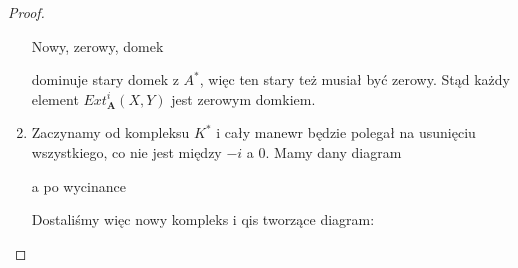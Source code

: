 \begin{proof}
\begin{enumerate}[label=(\alph*)]
      Nowy, zerowy, domek 
      \begin{center}\end{center}
      dominuje stary domek z $A^*$, więc ten stary też musiał być zerowy. Stąd każdy element $Ext^i_{\mathbf{A}}(X, Y)$ jest zerowym domkiem.
    
    \setcounter{enumi}{0}
    \item Zaczynamy od kompleksu $K^*$ i cały manewr będzie polegał na usunięciu wszystkiego, co nie jest między $-i$ a $0$. Mamy dany diagram
      \begin{center}\end{center}
      a po wycinance
      \begin{center}\end{center}
      Dostaliśmy więc nowy kompleks i qis tworzące diagram:
      \begin{center}\end{center}

\end{enumerate}
\end{proof}
